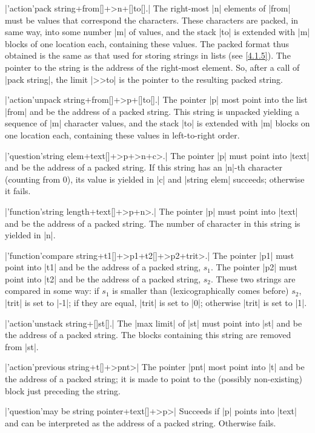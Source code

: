 \documentclass{article}
\newcommand\g[1]{{\sf #1}}
\begin{document}
\X\pp|'action'pack string+from[]+>n+[]to[].|\Y
The right-most \pp|n| elements of \pp|from| must be values that correspond
the characters. These characters are packed, in same way, into some number
\pp|m| of values, and the stack \pp|to| is extended with \pp|m| blocks of
one location each, containing these values. The packed format thus obtained
is the same as that used for storing \g{string}s in lists (see \ref{4.1.5}).
The pointer to the string is the address of the right-most element. So,
after a call of \pp|pack string|, the \g{limit} \pp|>>to| is the pointer to
the resulting packed string.

\X\pp|'action'unpack string+from[]+>p+[]to[].|\Y
The pointer \pp|p| most point into the list \pp|from| and be the address of
a packed string. This string is unpacked yielding a sequence of \pp|m|
character values, and the stack \pp|to| is extended with \pp|m| blocks on
one location each, containing these values in left-to-right order.

\X\pp|'question'string elem+text[]+>p+>n+c>.|\Y
The pointer \pp|p| must point into \pp|text| and be the address of a packed
string. If this string has an \pp|n|-th character (counting from 0), its
value is yielded in \pp|c| and \pp|string elem| succeeds; otherwise it
fails.

\X\pp|'function'string length+text[]+>p+n>.|\Y
The pointer \pp|p| must point into \pp|text| and be the address of a packed
string. The number of character in this string is yielded in \pp|n|.

\X\pp|'function'compare string+t1[]+>p1+t2[]+>p2+trit>.|\Y
The pointer \pp|p1| must point into \pp|t1| and be the address of a packed
string, $s_1$. The pointer \pp|p2| must point into \pp|t2| and be the
address of a packed string, $s_2$. These two strings are compared in some
way: if $s_1$ is smaller than (lexicographically comes before) $s_2$, \pp|trit| is
set to \pp|-1|; if they are equal, \pp|trit| is set to \pp|0|; otherwise
\pp|trit| is set to \pp|1|.

\X\pp|'action'unstack string+[]st[].|\Y
The \pp|max limit| of \pp|st| must point into \pp|st| and be the address of
a packed string. The blocks containing this string are removed from \pp|st|.

\X\pp|'action'previous string+t[]+>pnt>|\Y
The pointer \pp|pnt| most point into \pp|t| and be the address of a packed
string; it is made to point to the (possibly non-existing) block just
preceding the string.

\X\pp|'question'may be string pointer+text[]+>p>|\Y
Succeeds if \pp|p| points into \pp|text| and can be interpreted as the
address of a packed string. Otherwise fails.
\end{document}

